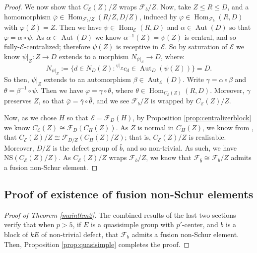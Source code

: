 \documentclass{amsart}
\theoremstyle{plain}\newtheorem{theorem}{Theorem}[section]
\theoremstyle{plain}\newtheorem{conjecture}[theorem]{Conjecture}
\theoremstyle{plain}\newtheorem{corollary}[theorem]{Corollary}
\theoremstyle{plain}\newtheorem{lemma}[theorem]{Lemma}
\theoremstyle{plain}\newtheorem{proposition}[theorem]{Proposition}
\theoremstyle{plain}\newtheorem{statement}[theorem]{}
\theoremstyle{definition}\newtheorem{definition}[theorem]{Definition}
\theoremstyle{definition}\newtheorem{example}[theorem]{Example}
\theoremstyle{definition}\newtheorem{examples}[theorem]{Examples}
\theoremstyle{definition}\newtheorem{notation}[theorem]{Notation}
\theoremstyle{definition}\newtheorem{remark}[theorem]{Remark}
\theoremstyle{definition}\newtheorem{remarks}[theorem]{Remarks}
\theoremstyle{definition}\newtheorem{question}[theorem]{Question}
\theoremstyle{definition}\newtheorem{propositiondefinition}[theorem]{Definition/Proposition}
\DeclareMathOperator{\Hom}{Hom}
\renewcommand{\phi}{\varphi}
\newcommand{\F}{\mathcal{F}}
\begin{document}
\begin{proof}
We now show that $C_\mathcal{E}(Z)/Z$ wraps $\F_b/Z$. Now, take $Z \leq R \leq D$, and a homomorphism $\bar\phi \in \Hom_{\F_b/Z}(R/Z, D/Z)$, induced by $\phi \in \Hom_{\F_b}(R,D)$ with $\phi(Z) = Z$.  Then we have $\psi \in \Hom_{\mathcal{E}}(R,D)$ and $\alpha \in \operatorname{Aut}(D)$ so that $\phi = \alpha \circ \psi$. As $\alpha \in \operatorname{Aut}(D)$ we know $\alpha^{-1}(Z) = \psi(Z)$ is central, and so fully-$\mathcal{E}$-centralized; therefore $\psi(Z)$ is receptive in $\mathcal{E}$. So by saturation of $\mathcal{E}$ we know $\psi|_{Z}:Z \rightarrow D$ extends to a morphism $N_{\psi|_{Z}} \rightarrow D$, where:
$$N_{\psi|_{Z}} := \{ d \in N_D(Z): \hspace{0pt}^{\psi|_{Z}} c_d \in \operatorname{Aut}_D(\psi(Z))\}=D.$$
So then, $\psi|_{Z}$ extends to an automorphism $\beta \in \operatorname{Aut}_\mathcal{E}(D)$. Write $\gamma = \alpha \circ \beta$ and $\theta = \beta^{-1} \circ \psi$. Then we have $\phi = \gamma \circ \theta$, where $\theta \in \Hom_{C_\mathcal{E}(Z)}(R,D)$. Moreover, $\gamma$ preserves $Z$, so that $\bar{\phi} = \bar{\gamma} \circ \bar{\theta}$, and we see $\mathcal{F}_b/Z$ is wrapped by $C_\mathcal{E}(Z)/Z$. 

Now, as we chose $H$ so that $\mathcal{E}= \F_D(H)$, by Proposition \ref{prop:centralizerblock} we know $C_\mathcal{E}(Z)\cong \mathcal{F}_D(C_H(Z))$. As $Z$ is normal in $C_H(Z)$, we know from \cite[Theorem 5.20]{Craven}, that $C_\mathcal{E}(Z)/Z \cong \F_{D/Z}(C_H(Z)/Z)$; that is, $C_\mathcal{E}(Z)/Z$ is realisable. Moreover, $D/Z$ is the defect group of $\bar{b}$, and so non-trivial. As such, we have $\mathrm{NS}(C_\mathcal{E}(Z)/Z)$. As $C_\mathcal{E}(Z)/Z$ wraps $\mathcal{F}_b/Z$, we know that $\mathcal{F}_{\bar{b}} \cong \mathcal{F}_b/Z$ admits a fusion non-Schur element.

\end{proof}

\subsection{Proof of existence of fusion non-Schur elements}
\begin{proof}[Proof of Theorem \ref{mainthm2}] The combined results of the last two sections verify that when $p>5$, if $E$ is a quasisimple group with $p'$-center, and $b$ is a block of $kE$ of non-trivial defect, that $\mathcal{F}_b$ admits a fusion non-Schur element. Then, Proposition \ref{prop:quasisimple} completes the proof.
\end{proof}


\end{document}
